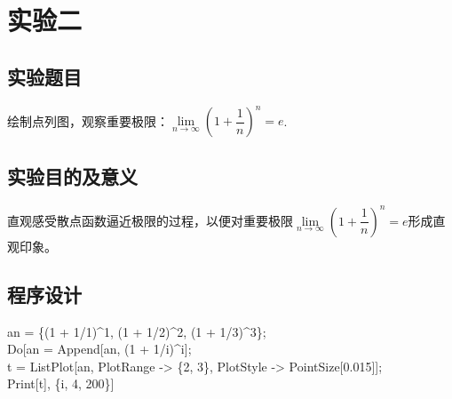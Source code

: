 \documentclass{ctexart}
\begin{document}
\section{实验二}
\subsection{实验题目}
绘制点列图，观察重要极限：$\lim\limits_{n\to\infty}(1+\dfrac{1}{n})^n=e$.
\subsection{实验目的及意义}
直观感受散点函数逼近极限的过程，以便对重要极限$\lim\limits_{n\to\infty}(1+\dfrac{1}{n})^n=e$形成直观印象。
\subsection{程序设计}
an = \{(1 + 1/1)\^{}1, (1 + 1/2)\^{}2, (1 + 1/3)\^{}3\};\\
Do[an = Append[an, (1 + 1/i)\^{}i];\\
t = ListPlot[an, PlotRange -> \{2, 3\}, PlotStyle -> PointSize[0.015]];\\
Print[t], \{i, 4, 200\}]
\end{document}
